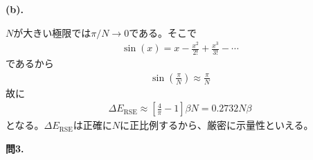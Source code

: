 \documentclass{jlreq}
\begin{document}
\noindent
\textbf{(b).}

$N$が大きい極限では$\pi/N\rightarrow 0$である。そこで
\begin{eqnarray}
    \sin(x)=x-\frac{x^2}{2!}+\frac{x^3}{3!}-\cdots
\end{eqnarray}
であるから
\begin{eqnarray}
    \sin\left(\frac{\pi}{N}\right)\approx\frac{\pi}{N}
\end{eqnarray}
故に
\begin{eqnarray}
    \Delta E_\text{RSE}\approx\left[\frac{4}{\pi}-1\right]\beta N=0.2732N\beta
\end{eqnarray}
となる。$\Delta E_\text{RSE}$は正確に$N$に正比例するから、厳密に示量性といえる。

\clearpage

\noindent
\textbf{問3.}\\
\end{document}
